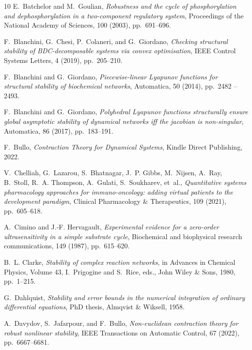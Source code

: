 \documentclass[onefignum,onetabnum]{siamonline220329}
\begin{document}
{\begin{thebibliography}{10}
	{\sc E.~Batchelor and M.~Goulian}, {\em Robustness and the cycle of
		phosphorylation and dephosphorylation in a two-component regulatory system},
	Proceedings of the National Academy of Sciences, 100 (2003), pp.~691--696.
	
	{\sc F.~Blanchini, G.~Chesi, P.~Colaneri, and G.~Giordano}, {\em Checking
		structural stability of {BDC}-decomposable systems via convex optimisation},
	IEEE Control Systems Letters, 4 (2019), pp.~205--210.
	
	{\sc F.~Blanchini and G.~Giordano}, {\em Piecewise-linear {L}yapunov functions
		for structural stability of biochemical networks}, Automatica, 50 (2014),
	pp.~2482 -- 2493.
	
	{\sc F.~Blanchini and G.~Giordano}, {\em Polyhedral {L}yapunov functions
		structurally ensure global asymptotic stability of dynamical networks iff the
		jacobian is non-singular}, Automatica, 86 (2017), pp.~183--191.
	
	{\sc F.~Bullo}, {\em Contraction Theory for Dynamical Systems}, Kindle Direct
	Publishing, 2022.
	
	{\sc V.~Chelliah, G.~Lazarou, S.~Bhatnagar, J.~P. Gibbs, M.~Nijsen, A.~Ray,
		B.~Stoll, R.~A. Thompson, A.~Gulati, S.~Soukharev, et~al.}, {\em Quantitative
		systems pharmacology approaches for immuno-oncology: adding virtual patients
		to the development paradigm}, Clinical Pharmacology \& Therapeutics, 109
	(2021), pp.~605--618.
	
	{\sc A.~Cimino and J.-F. Hervagault}, {\em Experimental evidence for a
		zero-order ultrasensitivity in a simple substrate cycle}, Biochemical and
	biophysical research communications, 149 (1987), pp.~615--620.
	
	{\sc B.~L. Clarke}, {\em Stability of complex reaction networks}, in Advances
	in Chemical Physics, Volume 43, I.~Prigogine and S.~Rice, eds., John Wiley \&
	Sons, 1980, pp.~1--215.
	
	{\sc G.~Dahlquist}, {\em Stability and error bounds in the numerical
		integration of ordinary differential equations}, PhD thesis, Almqvist \&
	Wiksell, 1958.
	
	{\sc A.~Davydov, S.~Jafarpour, and F.~Bullo}, {\em Non-euclidean contraction
		theory for robust nonlinear stability}, IEEE Transactions on Automatic
	Control, 67 (2022), pp.~6667--6681.
	

\end{thebibliography}}
\end{document}
